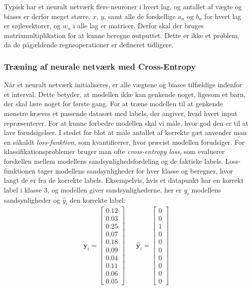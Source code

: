 \documentclass{article}
\begin{document}
Typisk har et neuralt netværk flere neuroner i hvert lag, og antallet af vægte og biases er derfor meget større. $x$, $y$, samt alle de forskellige $a_n$ og $b_n$ for hvert lag er søjlevektorer, og $w_n$ i alle lag er matricer. Derfor skal der bruges matrixmultiplikation for at kunne beregne outputtet. Dette er ikke et problem, da de pågældende regneoperationer er defineret tidligere.  
\newpage
\subsubsection{Træning af neurale netværk med Cross-Entropy}
Når et neuralt netværk initialiseres, er alle vægtene og biases tilfældige indenfor et interval. Dette betyder, at modellen ikke kan genkende noget, ligesom et barn, der skal lære noget for første gang. For at træne modellen til at genkende mønstre kræves et passende datasæt med labels, der angiver, hvad hvert input repræsenterer. For at kunne forbedre modellen skal vi måle, hvor god den er til at lave forudsigelser. I stedet for blot at måle antallet af korrekte gæt anvender man en såkaldt \textit{loss-funktion}, som kvantificerer, hvor præcist modellen forudsiger. For klassifikationsproblemer bruger man ofte \textit{cross-entropy loss}, som evaluerer forskellen mellem modellens sandsynlighedsfordeling og de faktiske labels. Loss-funktionen tager modellens sandsynligheder for hver klasse og beregner, hvor langt de er fra de korrekte labels. \parencite{sanderson2017neural,Sanderson_2017,Nielsen_2019b} Eksempelvis, hvis et datapunkt har en korrekt label i klasse 3, og modellen giver sandsynlighederne, her er $y_i$ modellens sandsynligheder og $\hat{y}_i$ den korrekte label:
\begin{align}
\mathbf{y}_i = \begin{bmatrix}
0.12 \\
0.03 \\
0.25 \\
0.07 \\
0.18 \\
0.09 \\
0.04 \\
0.11 \\
0.06 \\
0.05
\end{bmatrix}
&&
\hat{\mathbf{y}}_i = \begin{bmatrix}
0 \\
0 \\
1 \\
0 \\
0 \\
0 \\
0 \\
0 \\
0 \\
0
\end{bmatrix}
\end{align}
\end{document}
